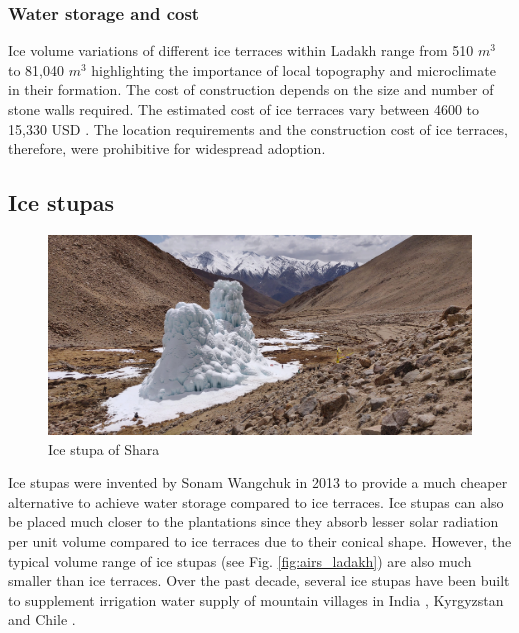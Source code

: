 \subsubsection{Water storage and cost}

Ice volume variations of different ice terraces within Ladakh \citep{nusserSociohydrologyArtificialGlaciers2019,
norphelSnowWaterHarvesting2015} range from 510 $m^3$ to 81,040 $m^3$ highlighting the importance of local topography and
microclimate in their formation. The cost of construction depends on the size and number of stone walls
required. The estimated cost of ice terraces vary between 4600 to 15,330 USD
\cite{nusserSociohydrologyArtificialGlaciers2019}. The location requirements and the construction cost of ice
terraces, therefore, were prohibitive for widespread adoption.

\subsection{Ice stupas}

\begin{figure}[htb]
\centering
\includegraphics[width=12cm]{figs/IS_example.jpg}
\caption{Ice stupa of Shara}
\label{fig:ISexample}
\end{figure}

Ice stupas were invented by Sonam Wangchuk in 2013 \cite{wangchukIceStupaArtificial2014} to provide a much
cheaper alternative to achieve water storage compared to ice terraces. Ice stupas can also be placed much closer
to the plantations since they absorb lesser solar radiation per unit volume compared to ice terraces due to
their conical shape. However, the typical volume range of ice stupas (see Fig. \ref{fig:airs_ladakh}) are also
much smaller than ice terraces. Over the past decade, several ice stupas have been built to supplement
irrigation water supply of mountain villages in India \citep{wangchukIceStupaCompetition2020,
palmerStoringFrozenWater2022, aggarwalAdaptationClimateChange2021}, Kyrgyzstan
\citep{bbcnewsBrightArtificialGlacier2020} and Chile \citep{reutersConservationistsChileAim2021}.


